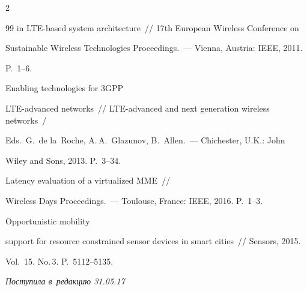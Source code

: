 \begin{multicols}{2}
{{\begin{thebibliography}{99}
in LTE-based system architecture~// 17th European Wireless Conference on 


Sustainable Wireless Technologies Proceedings.~--- Vienna, Austria: IEEE, 2011. 


P.~1--6.




 Enabling technologies for 3GPP 


LTE-advanced networks~// LTE-advanced and next generation wireless networks~/ 


Eds.\ G.~de la~Roche, A.\,A.~Glazunov, B.~Allen.~--- Chichester, U.K.: John 


Wiley and Sons, 2013. P.~3--34.




 Latency evaluation of a virtualized MME~//  


 Wireless Days Proceedings.~--- Toulouse, France: IEEE, 2016. P.~1--3.




 Opportunistic mobility 


support for resource constrained sensor devices in smart cities~// Sensors, 2015. 


Vol.~15. No.\,3. P.~5112--5135.


 \end{thebibliography}





 }


 }





\end{multicols}





\vspace*{-6pt}





\hfill{\small\textit{Поступила в~редакцию 31.05.17}}





\vspace*{8pt}





